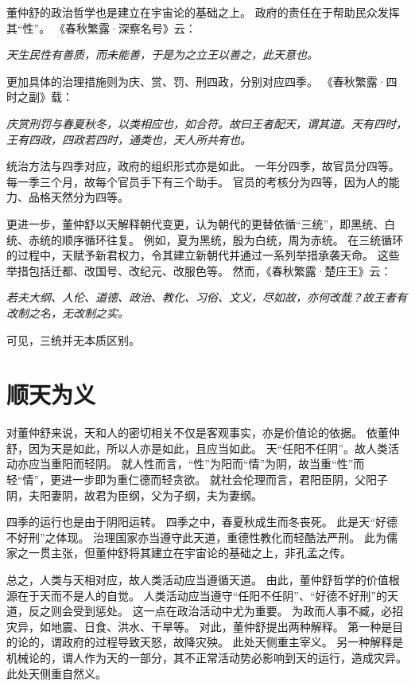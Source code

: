 \documentclass[11pt]{article}
\begin{document}
\par

董仲舒的政治哲学也是建立在宇宙论的基础之上。
政府的责任在于帮助民众发挥其“性”。
《春秋繁露·深察名号》云：

\textit{天生民性有善质，而未能善，于是为之立王以善之，此天意也。}

更加具体的治理措施则为庆、赏、罚、刑四政，分别对应四季。
《春秋繁露·四时之副》载：

\textit{庆赏刑罚与春夏秋冬，以类相应也，如合符。故曰王者配天，谓其道。天有四时，王有四政，四政若四时，通类也，天人所共有也。}

统治方法与四季对应，政府的组织形式亦是如此。
一年分四季，故官员分四等。
每一季三个月，故每个官员手下有三个助手。
官员的考核分为四等，因为人的能力、品格天然分为四等。

\par

更进一步，董仲舒以天解释朝代变更，认为朝代的更替依循“三统”，即黑统、白统、赤统的顺序循环往复。
例如，夏为黑统，殷为白统，周为赤统。
在三统循环的过程中，天赋予新君权力，令其建立新朝代并通过一系列举措承袭天命。
这些举措包括迁都、改国号、改纪元、改服色等。
然而，《春秋繁露·楚庄王》云：

\textit{若夫大纲、人伦、道德、政治、教化、习俗、文义，尽如故，亦何改哉？故王者有改制之名，无改制之实。}

可见，三统并无本质区别。

\section{顺天为义}
对董仲舒来说，天和人的密切相关不仅是客观事实，亦是价值论的依据。
依董仲舒，因为天是如此，所以人亦是如此，且应当如此。
天“任阳不任阴”。故人类活动亦应当重阳而轻阴。
就人性而言，“性”为阳而“情”为阴，故当重“性”而轻“情”，更进一步即为重仁德而轻贪欲。
就社会伦理而言，君阳臣阴，父阳子阴，夫阳妻阴，故君为臣纲，父为子纲，夫为妻纲。

\par

四季的运行也是由于阴阳运转。
四季之中，春夏秋成生而冬丧死。
此是天“好德不好刑”之体现。
治理国家亦当遵守此天道，重德性教化而轻酷法严刑。
此为儒家之一贯主张，但董仲舒将其建立在宇宙论的基础之上，非孔孟之传。

\par

总之，人类与天相对应，故人类活动应当遵循天道。
由此，董仲舒哲学的价值根源在于天而不是人的自觉。
人类活动应当遵守“任阳不任阴”、“好德不好刑”的天道，反之则会受到惩处。
这一点在政治活动中尤为重要。
为政而人事不臧，必招灾异，如地震、日食、洪水、干旱等。
对此，董仲舒提出两种解释。
第一种是目的论的，谓政府的过程导致天怒，故降灾殃。
此处天侧重主宰义。
另一种解释是机械论的，谓人作为天的一部分，其不正常活动势必影响到天的运行，造成灾异。
此处天侧重自然义。
\end{document}

